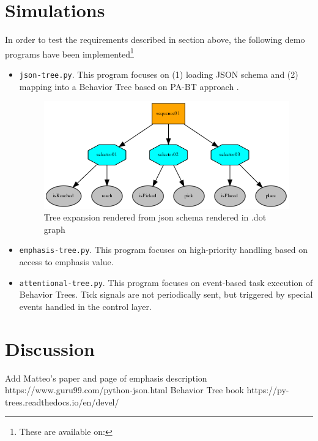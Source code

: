 \documentclass[conference]{IEEEtran}
\begin{document}
\section*{Simulations}
In order to test the requirements described in section above, the following demo programs have been implemented\footnote{These are available on:}
\begin{itemize}
\item \verb|json-tree.py|. This program focuses on (1) loading JSON schema and (2) mapping into a Behavior Tree based on PA-BT approach \cite{b3}.

\begin{figure}
  \includegraphics[width=\linewidth]{demo-json.png}
  \caption{Tree expansion rendered from json schema rendered in .dot graph}
  \label{fig:json-tree}
\end{figure}

\item \verb|emphasis-tree.py|. This program focuses on high-priority handling based on access to emphasis value\cite{b1}.
\item \verb|attentional-tree.py|. This program focuses on event-based task execution of Behavior Trees. Tick signals are not periodically sent, but triggered by special events handled in the control layer.
\end{itemize}
\section*{Discussion}




\begin{thebibliography}{00}
 Add Matteo's paper and page of emphasis description
https://www.guru99.com/python-json.html
 Behavior Tree book
 https://py-trees.readthedocs.io/en/devel/
\end{thebibliography}
\end{document}
